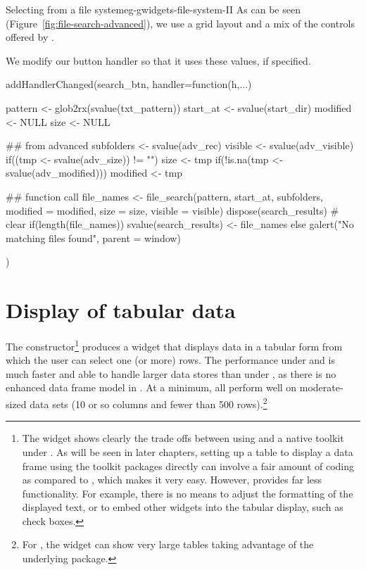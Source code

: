 \begin{example}{Selecting from a file system}{eg-gwidgets-file-system-II}
As can be seen (Figure~\ref{fig:file-search-advanced}), we use a grid
layout and a mix of the controls offered by .



We modify our button handler so that it uses these values, if
specified.

\begin{Schunk}
\begin{Sinput}
 addHandlerChanged(search_btn, handler=function(h,...) {
   pattern <- glob2rx(svalue(txt_pattern))
   start_at <- svalue(start_dir)
   modified <- NULL
   size <- NULL
 
   ## from advanced
   subfolders <- svalue(adv_rec)
   visible <- svalue(adv_visible)
   if((tmp <- svalue(adv_size)) != "") size <- tmp
   if(!is.na(tmp <- svalue(adv_modified))) modified <- tmp
   
   ## function call
   file_names <- file_search(pattern, start_at, subfolders, 
                         modified = modified,
                         size = size, visible = visible)
   dispose(search_results)                # clear
   if(length(file_names))
     svalue(search_results) <- file_names
   else
     galert("No matching files found", parent = window)
 })
\end{Sinput}
\end{Schunk}




\end{example}


\section{Display of tabular data}
\label{sec:gWidgets-tabular-data-display}


The  constructor\footnote{The
   widget shows clearly the trade offs between
  using  and a native toolkit under \R. As will be seen
  in later chapters, setting up a table to display a data frame using
  the toolkit packages directly can involve a fair amount of coding as
  compared to , which makes it very easy. However,
   provides far less functionality. For example, there
  is no means to adjust the formatting of the displayed text, or to
  embed other widgets into the tabular display, such as check boxes.
} produces a widget that displays data in a tabular form from which
the user can select one (or more) rows. The performance under
 and  is much faster and able to
handle larger data stores
than under , as there is no enhanced data frame model in
\tcltk. At a minimum, all perform well on moderate-sized data sets (10
or so columns and fewer than 500 rows).\footnote{For
  , the  widget can show very
  large tables taking advantage of the underlying 
  package.}

